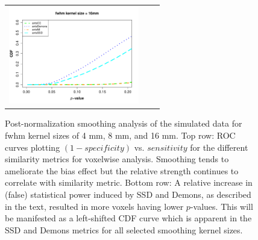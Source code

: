 \documentclass[final,5p,times,twocolumn]{elsarticle}
\begin{document}
\begin{figure}
\begin{center}
\begin{tabular}{ccc}
  \includegraphics[width=57mm]{ISV_CDFAlreadyAlignedSmooth2.pdf} 
\end{tabular}
\caption{Post-normalization smoothing analysis of the simulated data for
fwhm kernel sizes of 4 mm, 8 mm, and 16 mm.  Top row:  
ROC curves plotting $(1 - specificity)$ vs. $sensitivity$ for the
different similarity metrics for voxelwise analysis.  Smoothing
tends to ameliorate the bias effect but the relative strength
continues to correlate with similarity metric.  Bottom row:
A relative 
increase in (false) statistical power induced by SSD and Demons, as 
described in the text, resulted in more voxels having lower 
$p$-values.  This will be manifested as a left-shifted CDF 
curve which is apparent in the SSD and Demons metrics for all selected smoothing kernel sizes.
}
\label{fig:simulated_plots_smooth}
\end{center}        
\end{figure}
\end{document}
